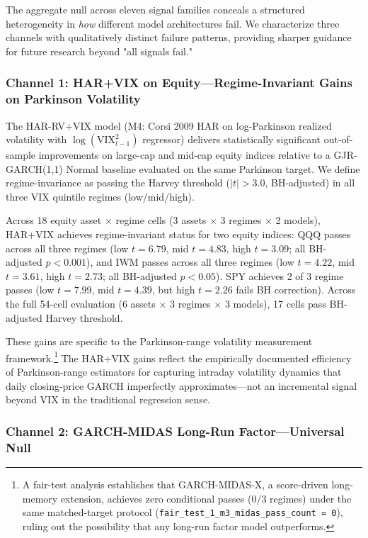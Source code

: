 \documentclass[12pt,a4paper]{article}
\begin{document}
The aggregate null across eleven signal families conceals a structured heterogeneity in \emph{how} different model architectures fail. We characterize three channels with qualitatively distinct failure patterns, providing sharper guidance for future research beyond "all signals fail."

\subsubsection{Channel 1: HAR+VIX on Equity---Regime-Invariant Gains on Parkinson Volatility}

The HAR-RV+VIX model (M4: Corsi 2009 HAR on log-Parkinson realized volatility with $\log(\text{VIX}^2_{t-1})$ regressor) delivers statistically significant out-of-sample improvements on large-cap and mid-cap equity indices relative to a GJR-GARCH(1,1) Normal baseline evaluated on the same Parkinson target. We define regime-invariance as passing the Harvey threshold ($|t|>3.0$, BH-adjusted) in all three VIX quintile regimes (low/mid/high).

Across 18 equity asset $\times$ regime cells (3 assets $\times$ 3 regimes $\times$ 2 models), HAR+VIX achieves regime-invariant status for two equity indices: QQQ passes across all three regimes (low $t=6.79$, mid $t=4.83$, high $t=3.09$; all BH-adjusted $p < 0.001$), and IWM passes across all three regimes (low $t=4.22$, mid $t=3.61$, high $t=2.73$; all BH-adjusted $p < 0.05$). SPY achieves 2 of 3 regime passes (low $t=7.99$, mid $t=4.39$, but high $t=2.26$ fails BH correction). Across the full 54-cell evaluation (6 assets $\times$ 3 regimes $\times$ 3 models), 17 cells pass BH-adjusted Harvey threshold.

These gains are specific to the Parkinson-range volatility measurement framework.\footnote{A fair-test analysis establishes that GARCH-MIDAS-X, a score-driven long-memory extension, achieves zero conditional passes (0/3 regimes) under the same matched-target protocol (\texttt{fair\_test\_1\_m3\_midas\_pass\_count = 0}), ruling out the possibility that any long-run factor model outperforms.} The HAR+VIX gains reflect the empirically documented efficiency of Parkinson-range estimators for capturing intraday volatility dynamics that daily closing-price GARCH imperfectly approximates---not an incremental signal beyond VIX in the traditional regression sense.

\subsubsection{Channel 2: GARCH-MIDAS Long-Run Factor---Universal Null}
\end{document}
